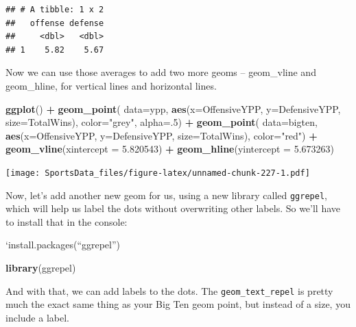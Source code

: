\documentclass[
]{book}
\newenvironment{Shaded}{\begin{snugshade}}{\end{snugshade}}
\newcommand{\DataTypeTok}[1]{\textcolor[rgb]{0.13,0.29,0.53}{#1}}
\newcommand{\DecValTok}[1]{\textcolor[rgb]{0.00,0.00,0.81}{#1}}
\newcommand{\FloatTok}[1]{\textcolor[rgb]{0.00,0.00,0.81}{#1}}
\newcommand{\KeywordTok}[1]{\textcolor[rgb]{0.13,0.29,0.53}{\textbf{#1}}}
\newcommand{\NormalTok}[1]{#1}
\newcommand{\OperatorTok}[1]{\textcolor[rgb]{0.81,0.36,0.00}{\textbf{#1}}}
\newcommand{\StringTok}[1]{\textcolor[rgb]{0.31,0.60,0.02}{#1}}
\begin{document}
\begin{verbatim}
## # A tibble: 1 x 2
##   offense defense
##     <dbl>   <dbl>
## 1    5.82    5.67
\end{verbatim}

Now we can use those averages to add two more geoms -- geom\_vline and geom\_hline, for vertical lines and horizontal lines.

\begin{Shaded}
\begin{Highlighting}[]
\KeywordTok{ggplot}\NormalTok{() }\OperatorTok{+}\StringTok{ }
\StringTok{  }\KeywordTok{geom_point}\NormalTok{(}
    \DataTypeTok{data=}\NormalTok{ypp, }
    \KeywordTok{aes}\NormalTok{(}\DataTypeTok{x=}\NormalTok{OffensiveYPP, }\DataTypeTok{y=}\NormalTok{DefensiveYPP, }\DataTypeTok{size=}\NormalTok{TotalWins), }
    \DataTypeTok{color=}\StringTok{"grey"}\NormalTok{, }
    \DataTypeTok{alpha=}\NormalTok{.}\DecValTok{5}\NormalTok{) }\OperatorTok{+}\StringTok{ }
\StringTok{  }\KeywordTok{geom_point}\NormalTok{(}
    \DataTypeTok{data=}\NormalTok{bigten, }
    \KeywordTok{aes}\NormalTok{(}\DataTypeTok{x=}\NormalTok{OffensiveYPP, }\DataTypeTok{y=}\NormalTok{DefensiveYPP, }\DataTypeTok{size=}\NormalTok{TotalWins), }
    \DataTypeTok{color=}\StringTok{"red"}\NormalTok{) }\OperatorTok{+}\StringTok{ }
\StringTok{  }\KeywordTok{geom_vline}\NormalTok{(}\DataTypeTok{xintercept =} \FloatTok{5.820543}\NormalTok{) }\OperatorTok{+}\StringTok{ }
\StringTok{  }\KeywordTok{geom_hline}\NormalTok{(}\DataTypeTok{yintercept =} \FloatTok{5.673263}\NormalTok{)}
\end{Highlighting}
\end{Shaded}

\texttt{[image: SportsData\_files/figure-latex/unnamed-chunk-227-1.pdf]}

Now, let's add another new geom for us, using a new library called \texttt{ggrepel}, which will help us label the dots without overwriting other labels. So we'll have to install that in the console:

`install.packages(``ggrepel'')

\begin{Shaded}
\begin{Highlighting}[]
\KeywordTok{library}\NormalTok{(ggrepel)}
\end{Highlighting}
\end{Shaded}

And with that, we can add labels to the dots. The \texttt{geom\_text\_repel} is pretty much the exact same thing as your Big Ten geom point, but instead of a size, you include a label.
\end{document}

